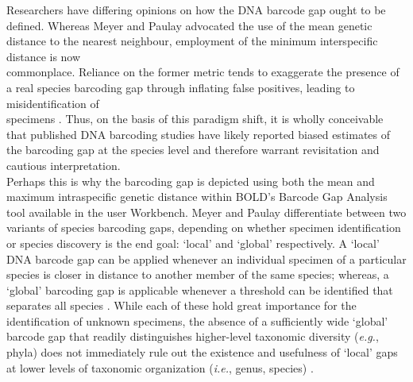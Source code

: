 Researchers have differing opinions on how the DNA barcode gap ought to be defined. Whereas Meyer and Paulay \cite{meyer2005dna} advocated the use of the mean genetic distance to the nearest neighbour, employment of the minimum interspecific distance is now \\ commonplace. Reliance on the former metric tends to exaggerate the presence of a real species barcoding gap through inflating false positives, leading to misidentification of \\ specimens \cite{meier2008use}. Thus, on the basis of this paradigm shift, it is wholly conceivable that published DNA barcoding studies have likely reported biased estimates of the barcoding gap at the species level and therefore warrant revisitation and cautious interpretation. \\ Perhaps this is why the barcoding gap is depicted using both the mean and maximum intraspecific genetic distance within BOLD's Barcode Gap Analysis tool available in the user Workbench. Meyer and Paulay \cite{meyer2005dna} differentiate between two variants of species barcoding gaps, depending on whether specimen identification or species discovery is the end goal: `local' and `global' respectively. A `local' DNA barcode gap can be applied whenever an individual specimen of a particular species is closer in distance to another member of the same species; whereas, a `global' barcoding gap is applicable whenever a threshold can be identified that separates all species \cite{collins2013seven}. While each of these hold great importance for the identification of unknown specimens, the absence of a sufficiently wide `global' barcode gap that readily distinguishes higher-level taxonomic diversity (\textit{e.g.}, phyla) does not immediately rule out the existence and usefulness of `local' gaps at lower levels of taxonomic organization (\textit{i.e.}, genus, species) \cite{koroiva2018estimating, kvist2017does}.  



